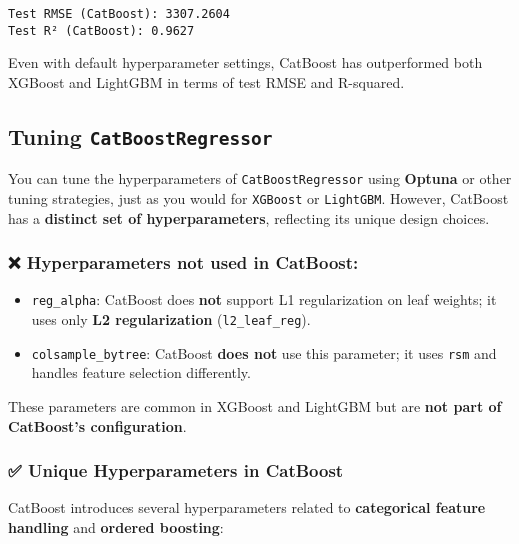 \documentclass[
  letterpaper,
  DIV=11,
  numbers=noendperiod]{scrreprt}
\providecommand{\tightlist}{%
  \setlength{\itemsep}{0pt}\setlength{\parskip}{0pt}}\usepackage{longtable,booktabs,array}
\begin{document}
\begin{verbatim}
Test RMSE (CatBoost): 3307.2604
Test R² (CatBoost): 0.9627
\end{verbatim}

Even with default hyperparameter settings, CatBoost has outperformed
both XGBoost and LightGBM in terms of test RMSE and R-squared.

\subsection{\texorpdfstring{Tuning
\texttt{CatBoostRegressor}}{Tuning CatBoostRegressor}}\label{tuning-catboostregressor}

You can tune the hyperparameters of \texttt{CatBoostRegressor} using
\textbf{Optuna} or other tuning strategies, just as you would for
\texttt{XGBoost} or \texttt{LightGBM}. However, CatBoost has a
\textbf{distinct set of hyperparameters}, reflecting its unique design
choices.

\subsubsection{\texorpdfstring{❌ Hyperparameters \textbf{not used} in
CatBoost:}{❌ Hyperparameters not used in CatBoost:}}\label{hyperparameters-not-used-in-catboost}

\begin{itemize}
\tightlist
\item
  \texttt{reg\_alpha}: CatBoost does \textbf{not} support L1
  regularization on leaf weights; it uses only \textbf{L2
  regularization} (\texttt{l2\_leaf\_reg}).
\item
  \texttt{colsample\_bytree}: CatBoost \textbf{does not} use this
  parameter; it uses \texttt{rsm} and handles feature selection
  differently.
\end{itemize}

These parameters are common in XGBoost and LightGBM but are \textbf{not
part of CatBoost's configuration}.

\subsubsection{✅ Unique Hyperparameters in
CatBoost}\label{unique-hyperparameters-in-catboost}

CatBoost introduces several hyperparameters related to
\textbf{categorical feature handling} and \textbf{ordered boosting}:
\end{document}

